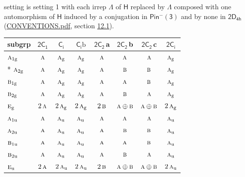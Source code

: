 \documentclass[10pt,a4paper]{article}
\numberwithin{equation}{section}
\newcommand{\grp}[1]{\mathsf{#1}}
\newcommand{\irr}[1]{\text{\normalfont\scshape #1}}
\newcommand{\ptag}[1]{\mathrm{#1}}
\newcommand{\clsletter}[1]{\,{\scriptsize\color{black!55}#1}}
\newcommand{\secondclass}{\mathrm{b}}
\begin{document}
setting is setting 1 with each irrep $\Lambda$ of $\grp{H}$ replaced by $\Lambda$ composed with one automorphism of $\grp{H}$ induced by a conjugation in \href{Pinminus3.pdf}{$\grp{Pin^{-}(3)}$} and by none in $\grp{2D_{4h}}$ (\href{../../CONVENTIONS.pdf}{CONVENTIONS.pdf}, section \href{../../../rotation/CONVENTIONS.pdf\#conv.12.1}{12.1}).
{\small\begin{longtable}{@{}lccccccc@{}}\toprule
subgrp & \href{2C1.pdf}{$\grp{2C_{1}}$} & \href{S2.pdf}{$\grp{C_{i}}$} & \href{S2b.pdf}{$\grp{C_{i}}\secondclass$} & \href{2C2.pdf}{$\grp{2C_{2}}$}\clsletter{a} & \href{2C2.pdf}{$\grp{2C_{2}}$}\clsletter{b} & \href{2C2.pdf}{$\grp{2C_{2}}$}\clsletter{c} & \href{2S2.pdf}{$\grp{2C_{i}}$}\\\midrule\endhead
\bottomrule\endfoot\endlastfoot
$\irr{a}_{1\ptag{g}}$ & $\irr{a}$ & $\irr{a}_{\ptag{g}}$ & $\irr{a}_{\ptag{g}}$ & $\irr{a}$ & $\irr{a}$ & $\irr{a}$ & $\irr{a}_{\ptag{g}}$\\*
$\irr{a}_{2\ptag{g}}$ & $\irr{a}$ & $\irr{a}_{\ptag{g}}$ & $\irr{a}_{\ptag{g}}$ & $\irr{a}$ & $\irr{b}$ & $\irr{b}$ & $\irr{a}_{\ptag{g}}$\\
$\irr{b}_{1\ptag{g}}$ & $\irr{a}$ & $\irr{a}_{\ptag{g}}$ & $\irr{a}_{\ptag{g}}$ & $\irr{a}$ & $\irr{a}$ & $\irr{b}$ & $\irr{a}_{\ptag{g}}$\\
$\irr{b}_{2\ptag{g}}$ & $\irr{a}$ & $\irr{a}_{\ptag{g}}$ & $\irr{a}_{\ptag{g}}$ & $\irr{a}$ & $\irr{b}$ & $\irr{a}$ & $\irr{a}_{\ptag{g}}$\\
$\irr{e}_{\ptag{g}}$ & $2\,\irr{a}$ & $2\,\irr{a}_{\ptag{g}}$ & $2\,\irr{a}_{\ptag{g}}$ & $2\,\irr{b}$ & $\irr{a}\oplus \irr{b}$ & $\irr{a}\oplus \irr{b}$ & $2\,\irr{a}_{\ptag{g}}$\\
$\irr{a}_{1\ptag{u}}$ & $\irr{a}$ & $\irr{a}_{\ptag{u}}$ & $\irr{a}_{\ptag{u}}$ & $\irr{a}$ & $\irr{a}$ & $\irr{a}$ & $\irr{a}_{\ptag{u}}$\\
$\irr{a}_{2\ptag{u}}$ & $\irr{a}$ & $\irr{a}_{\ptag{u}}$ & $\irr{a}_{\ptag{u}}$ & $\irr{a}$ & $\irr{b}$ & $\irr{b}$ & $\irr{a}_{\ptag{u}}$\\
$\irr{b}_{1\ptag{u}}$ & $\irr{a}$ & $\irr{a}_{\ptag{u}}$ & $\irr{a}_{\ptag{u}}$ & $\irr{a}$ & $\irr{a}$ & $\irr{b}$ & $\irr{a}_{\ptag{u}}$\\
$\irr{b}_{2\ptag{u}}$ & $\irr{a}$ & $\irr{a}_{\ptag{u}}$ & $\irr{a}_{\ptag{u}}$ & $\irr{a}$ & $\irr{b}$ & $\irr{a}$ & $\irr{a}_{\ptag{u}}$\\
$\irr{e}_{\ptag{u}}$ & $2\,\irr{a}$ & $2\,\irr{a}_{\ptag{u}}$ & $2\,\irr{a}_{\ptag{u}}$ & $2\,\irr{b}$ & $\irr{a}\oplus \irr{b}$ & $\irr{a}\oplus \irr{b}$ & $2\,\irr{a}_{\ptag{u}}$\\

\end{longtable}}
\end{document}
